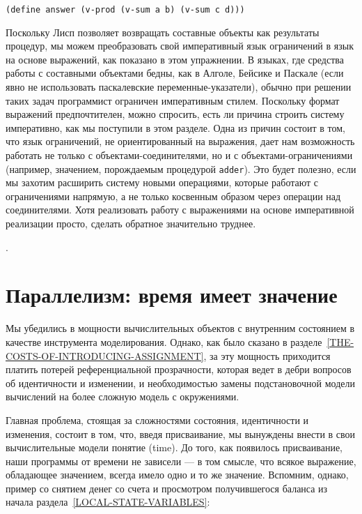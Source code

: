 \begin{exercise}{3.37}
{\begin{Verbatim}[fontsize=\footnotesize]
(define answer (v-prod (v-sum a b) (v-sum c d)))
\end{Verbatim}
Поскольку Лисп позволяет возвращать составные объекты как результаты
процедур, мы можем преобразовать свой императивный язык ограничений в
язык на основе выражений, как показано в этом упражнении.  В
языках, где средства работы с составными объектами бедны, как в
Алголе,
 Бейсике и
Паскале
(если явно не использовать паскалевские
переменные-указатели), обычно при решении таких задач программист
ограничен императивным стилем.  Поскольку формат выражений
предпочтителен, можно спросить, есть ли причина строить систему
императивно, как мы поступили в этом разделе.  Одна из причин состоит в
том, что язык ограничений, не ориентированный на выражения, дает нам
возможность работать не только с объектами-соединителями,
но и с объектами-ограничениями (например, значением,
порождаемым процедурой {\tt adder}). Это будет полезно,
если мы захотим расширить систему новыми операциями, которые
работают с ограничениями напрямую, а  не только косвенным образом через
операции над соединителями.  Хотя реализовать работу с выражениями на
основе императивной реализации просто, сделать обратное значительно
труднее.
}.
\end{exercise}

\section{Параллелизм: время имеет значение}
\label{CONCURRENCY-TIME-IS-OF-THE-ESSENCE}


Мы убедились в мощности вычислительных объектов с внутренним
состоянием в качестве инструмента моделирования. Однако, как было
сказано в
разделе~\ref{THE-COSTS-OF-INTRODUCING-ASSIGNMENT}, за эту мощность
приходится платить потерей референциальной прозрачности, которая ведет
в дебри вопросов об идентичности и изменении, и необходимостью замены
подстановочной модели вычислений на более сложную модель с
окружениями.

Главная проблема, стоящая за сложностями состояния,
идентичности и изменения, состоит в том, что, введя присваивание, мы
вынуждены внести в свои вычислительные модели понятие 
 (time).  До того, как появилось
присваивание, наши программы от времени не зависели --- в том смысле, что
всякое выражение, обладающее значением, всегда имело одно и то же
значение. Вспомним, однако, пример со снятием денег со счета и
просмотром получившегося баланса из начала
раздела~\ref{LOCAL-STATE-VARIABLES}:

